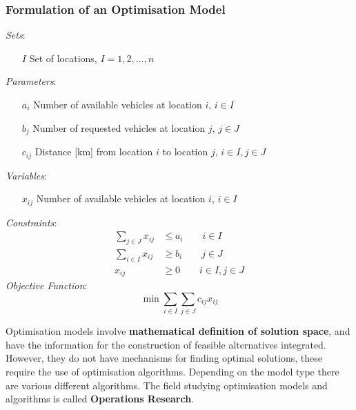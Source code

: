 \documentclass[11pt]{article}
\begin{document}
\subsubsection{Formulation of an Optimisation Model}
\emph{Sets}:
\begin{itemize}
	\item[$I$] Set of locations, $I={1,2,\dots,n}$
\end{itemize}
\noindent
\emph{Parameters}:
\begin{itemize}
	\item[$a_i$] Number of available vehicles at location $i$, $i\in I$
	\item[$b_j$] Number of requested vehicles at location $j$, $j\in J$
	\item[$c_{ij}$] Distance [km] from location $i$ to location $j$, $i\in I, j\in J$
\end{itemize}
\noindent
\emph{Variables}:
\begin{itemize}
	\item[$x_{ij}$] Number of available vehicles at location $i$, $i\in I$
\end{itemize}
\noindent
\emph{Constraints}:
\begin{align*}
	\sum_{j\in J} x_{ij} &\leq a_i \qquad i\in I\\
	\sum_{i\in I} x_{ij} &\geq b_i \qquad j\in J\\
	x_{ij}&\geq 0 \qquad i\in I,  j\in J
\end{align*}
\noindent
\emph{Objective Function}:
\begin{equation*}
	\min\sum_{i\in I}\sum_{j\in J}c_{ij}x_{ij}
\end{equation*}

\noindent
Optimisation models involve \textbf{mathematical definition of solution space}, and have the information for the construction of feasible alternatives integrated. However, they do not have mechanisms for finding optimal solutions, these require the use of optimisation algorithms. Depending on the model type there are various different algorithms. The field studying optimisation models and algorithms is called \textbf{Operations Research}.
\end{document}
